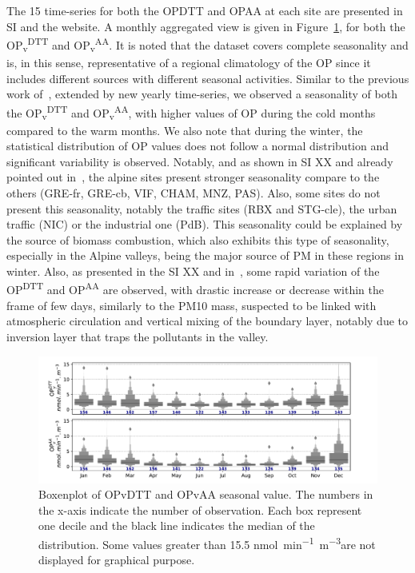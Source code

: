 \documentclass[acp]{copernicus}
\newcommand{\uOPv}{\unit{nmol~min^{-1}~m^{-3}}}
\begin{document}
The 15 time-series for both the OPDTT and OPAA at each site are
presented in SI and the website. A monthly aggregated view is given in
Figure~\ref{fig:fig3}, for both the
OP\textsubscript{v}\textsuperscript{DTT} and
OP\textsubscript{v}\textsuperscript{AA}. It is noted that the dataset
covers complete seasonality and is, in this sense, representative of a
regional climatology of the OP since it includes different sources with
different seasonal activities. Similar to the previous work
of~\citet{calasComparison2018,calasSeasonal2019}, extended by new yearly time-series, we observed a
seasonality of both the OP\textsubscript{v}\textsuperscript{DTT} and
OP\textsubscript{v}\textsuperscript{AA}, with higher values of OP during
the cold months compared to the warm months. We also note that during
the winter, the statistical distribution of OP values does not follow a
normal distribution and significant variability is observed. Notably,
and as shown in SI XX and already pointed out in~\citet{calasSeasonal2019},
the alpine sites present stronger seasonality compare to the others
(GRE-fr, GRE-cb, VIF, CHAM, MNZ, PAS). Also, some sites do not present
this seasonality, notably the traffic sites (RBX and STG-cle), the urban
traffic (NIC) or the industrial one (PdB). This seasonality could be
explained by the source of biomass combustion, which also exhibits this
type of seasonality, especially in the Alpine valleys, being the major
source of PM in these regions in winter. Also, as presented in the SI XX
and in~\citet{calasSeasonal2019}, some rapid variation of the
OP\textsuperscript{DTT} and OP\textsuperscript{AA} are observed, with
drastic increase or decrease within the frame of few days, similarly to
the PM10 mass, suspected to be linked with atmospheric circulation and
vertical mixing of the boundary layer, notably due to inversion layer
that traps the pollutants in the valley.


\begin{figure}[ht]
    \centering
    \includegraphics[width=1.0\linewidth]{figures/fig3}
    \caption{
    Boxenplot of OPvDTT and OPvAA seasonal value. The numbers in the x-axis
    indicate the number of observation. Each box represent one decile and the
    black line indicates the median of the distribution. Some values greater
    than 15.5 \uOPv are not displayed for graphical purpose. 
    }%
    \label{fig:fig3}
\end{figure}
\end{document}
